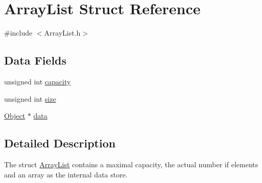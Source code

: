 \hypertarget{structArrayList}{\section{Array\-List Struct Reference}
\label{structArrayList}
}


{\ttfamily \#include $<$Array\-List.\-h$>$}

\subsection*{Data Fields}
\begin{DoxyCompactItemize}
\item 
unsigned int \hyperlink{structArrayList_ad9b336b3ba505e3ed41e956a41e4ae87}{capacity}
\item 
unsigned int \hyperlink{structArrayList_a2dd219b2d42d20b6abc50b8ba989dd3d}{size}
\item 
\hyperlink{ArrayList_8h_a6c6a43427b3458a4b2bf59b2db3995c3}{Object} $\ast$ \hyperlink{structArrayList_ae2c5fff51ffd10f506fec17a04931f2b}{data}
\end{DoxyCompactItemize}


\subsection{Detailed Description}
The struct \hyperlink{structArrayList}{Array\-List} contains a maximal capacity, the actual number if elements and an array as the internal data store. 

